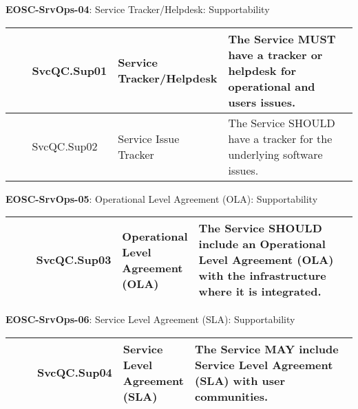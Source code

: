\textbf{EOSC-SrvOps-04}: Service Tracker/Helpdesk: Supportability
\nopagebreak[4]
\begin{center}
    \tabletail{\hline}
    \tiny
    \begin{supertabular}{|p{0.10\linewidth}|p{0.10\linewidth}|p{0.20\linewidth}|p{0.60\linewidth}|} \hline
        \cite{orviz_fernandez_eosc-synergy_2020} & SvcQC.Sup01 & Service Tracker/Helpdesk & The Service MUST have a tracker or helpdesk for operational and users issues.\\ \hline
        \cite{orviz_fernandez_eosc-synergy_2020} & SvcQC.Sup02 & Service Issue Tracker & The Service SHOULD have a tracker for the underlying software issues.\\ \hline
    \end{supertabular}
\end{center}

\textbf{EOSC-SrvOps-05}: Operational Level Agreement (OLA): Supportability
\nopagebreak[4]
\begin{center}
    \tabletail{\hline}
    \tiny
    \begin{supertabular}{|p{0.10\linewidth}|p{0.10\linewidth}|p{0.20\linewidth}|p{0.60\linewidth}|} \hline
        \cite{orviz_fernandez_eosc-synergy_2020} & SvcQC.Sup03 & Operational Level Agreement (OLA) & The Service SHOULD include an Operational Level Agreement (OLA) with the infrastructure where it is integrated.\\ \hline
    \end{supertabular}
\end{center}

\textbf{EOSC-SrvOps-06}: Service Level Agreement (SLA): Supportability
\nopagebreak[4]
\begin{center}
    \tabletail{\hline}
    \tiny
    \begin{supertabular}{|p{0.10\linewidth}|p{0.10\linewidth}|p{0.20\linewidth}|p{0.60\linewidth}|} \hline
        \cite{orviz_fernandez_eosc-synergy_2020} & SvcQC.Sup04 & Service Level Agreement (SLA) & The Service MAY include Service Level Agreement (SLA) with user communities.\\ \hline
    \end{supertabular}
\end{center}

